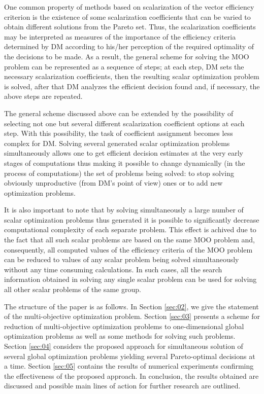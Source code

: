 \documentclass[runningheads]{llncs}
\begin{document}
One common property of methods based on scalarization of the vector efficiency criterion is the existence of some scalarization coefficients that can be varied to obtain different solutions from the Pareto set. Thus, the scalarization coefficients may be interpreted as measures of the importance of the efficiency criteria determined by DM according to his/her perception of the required optimality of the decisions to be made. As a result, the general scheme for solving the MOO problem can be represented as a sequence of steps; at each step, DM sets the necessary scalarization coefficients, then the resulting scalar optimization problem is solved, after that DM analyzes the efficient decision found and, if necessary, the above steps are repeated.

The general scheme discussed above can be extended by the possibility of selecting not one but several different scalarization coefficient options at each step. With this possibility, the task of coefficient assignment becomes less complex for DM. Solving several generated scalar optimization problems simultaneously allows one to get efficient decision estimates at the very early stages of computations thus making it possible to change dynamically (in the process of computations) the set of problems being solved: to stop solving obviously unproductive (from DM's point of view) ones or to add new optimization problems.

It is also important to note that by solving simultaneously a large number of scalar optimization problems thus generated it is possible to significantly decrease computational complexity of each separate problem. This effect is achived due to the fact that all such scalar problems  are based on the same MOO problem and, consequently, all computed values of the efficiency criteria of the MOO problem can be reduced to values of any scalar problem being solved simultaneously without any time consuming calculations. In such cases, all the search information obtained in solving any single scalar problem can be used for solving all other scalar problems of the same group. 

The structure of the paper is as follows. In Section \ref{sec:02}, we give the statement of the multi-objective optimization problem. Section \ref{sec:03} presents a scheme for reduction of multi-objective optimization problems to one-dimensional global optimization problems as well as some methods for solving such problems. Section \ref{sec:04} considers the proposed approach for simultaneous solution of several global optimization problems yielding several Pareto-optimal decisions at a time. Section \ref{sec:05} contains the results of numerical experiments confirming the effectiveness of the proposed approach. In conclusion, the results obtained are discussed and possible main lines of action for further research are outlined.
\end{document}
